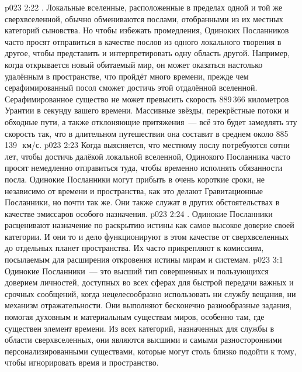 \vs p023 2:22 . Локальные вселенные, расположенные в пределах одной и той же сверхвселенной, обычно обмениваются послами, отобранными из их местных категорий сыновства. Но чтобы избежать промедления, Одиноких Посланников часто просят отправиться в качестве послов из одного локального творения в другое, чтобы представить и интерпретировать одну область другой. Например, когда открывается новый обитаемый мир, он может оказаться настолько удалённым в пространстве, что пройдёт много времени, прежде чем серафимированный посол сможет достичь этой отдалённой вселенной. Серафимированное существо не может превысить скорость 889\,366 километров Урантии в секунду вашего времени. Массивные звёзды, перекрёстные потоки и обходные пути, а также отклоняющие притяжения~--- всё это будет замедлять эту скорость так, что в длительном путешествии она составит в среднем около 885\,139~\,км/с.
\vs p023 2:23 Когда выясняется, что местному послу потребуются сотни лет, чтобы достичь далёкой локальной вселенной, Одинокого Посланника часто просят немедленно отправиться туда, чтобы временно исполнять обязанности посла. Одинокие Посланники могут прибыть в очень короткие сроки, не независимо от времени и пространства, как это делают Гравитационные Посланники, но почти так же. Они также служат в других обстоятельствах в качестве эмиссаров особого назначения.
\vs p023 2:24 . Одинокие Посланники расценивают назначение по раскрытию истины как самое высокое доверие своей категории. И они то и дело функционируют в этом качестве от сверхвселенных до отдельных планет пространства. Их часто прикрепляют к комиссиям, посылаемым для расширения откровения истины мирам и системам.
\vs p023 3:1 Одинокие Посланники~--- это высший тип совершенных и пользующихся доверием личностей, доступных во всех сферах для быстрой передачи важных и срочных сообщений, когда нецелесообразно использовать ни службу вещания, ни механизм отражательности. Они выполняют бесконечно разнообразные задания, помогая духовным и материальным существам миров, особенно там, где существен элемент времени. Из всех категорий, назначенных для службы в области сверхвселенных, они являются высшими и самыми разносторонними персонализированными существами, которые могут столь близко подойти к тому, чтобы игнорировать время и пространство.
